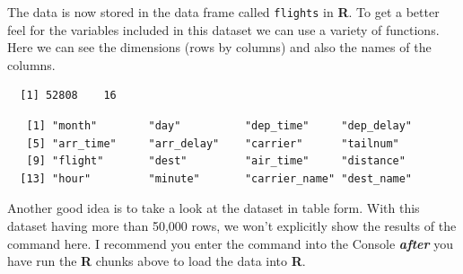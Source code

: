 \documentclass[12pt,twoside]{reedthesis}
\begin{document}
  \begin{Shaded}
  \begin{Highlighting}[]
  \StringTok{ }\NormalTok{(}\NormalTok{)}
  \end{Highlighting}
  \end{Shaded}
  
  The data is now stored in the data frame called \texttt{flights} in
  \textbf{R}. To get a better feel for the variables included in this
  dataset we can use a variety of functions. Here we can see the
  dimensions (rows by columns) and also the names of the columns.
  
  \begin{Shaded}
  \begin{Highlighting}[]
  \end{Highlighting}
  \end{Shaded}
  
  \begin{verbatim}
  [1] 52808    16
  \end{verbatim}
  
  \begin{Shaded}
  \begin{Highlighting}[]
  \end{Highlighting}
  \end{Shaded}
  
  \begin{verbatim}
   [1] "month"        "day"          "dep_time"     "dep_delay"   
   [5] "arr_time"     "arr_delay"    "carrier"      "tailnum"     
   [9] "flight"       "dest"         "air_time"     "distance"    
  [13] "hour"         "minute"       "carrier_name" "dest_name"   
  \end{verbatim}
  
  Another good idea is to take a look at the dataset in table form. With
  this dataset having more than 50,000 rows, we won't explicitly show the
  results of the command here. I recommend you enter the command into the
  Console \textbf{\emph{after}} you have run the \textbf{R} chunks above
  to load the data into \textbf{R}.
  
  \begin{Shaded}
  \begin{Highlighting}[]
  \end{Highlighting}
  \end{Shaded}
  
\end{document}
